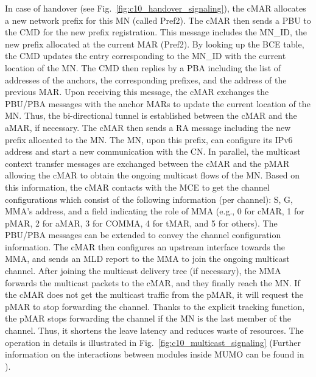 In case of handover (see Fig.~\ref{fig:c10_handover_signaling}), the cMAR allocates a new network prefix for this MN (called Pref2). The cMAR then sends a PBU to the CMD for the new prefix registration. This message includes the MN\_ID, the new prefix allocated at the current MAR (Pref2). By looking up the BCE table, the CMD updates the entry corresponding to the MN\_ID with the current location of the MN. The CMD then replies by a PBA including the list of addresses of the anchors, the corresponding prefixes, and the address of the previous MAR. Upon receiving this message, the cMAR exchanges the PBU/PBA messages with the anchor MARs to update the current location of the MN. Thus, the bi-directional tunnel is established between the cMAR and the aMAR, if necessary. The cMAR then sends a RA message including the new prefix allocated to the MN. The MN, upon this prefix, can configure its IPv6 address and start a new communication with the CN. In parallel, the multicast context transfer messages are exchanged between the cMAR and the pMAR allowing the cMAR to obtain the ongoing multicast flows of the MN. Based on this information, the cMAR contacts with the MCE to get the channel configurations which consist of the following information (per channel): S, G, MMA's address, and a field indicating the role of MMA (e.g., 0 for cMAR, 1 for pMAR, 2 for aMAR, 3 for COMMA, 4 for tMAR, and 5 for others). The PBU/PBA messages can be extended to convey the channel configuration information. The cMAR then configures an upstream interface towards the MMA, and sends an MLD report to the MMA to join the ongoing multicast channel. After joining the multicast delivery tree (if necessary), the MMA forwards the multicast packets to the cMAR, and they finally reach the MN. If the cMAR does not get the multicast traffic from the pMAR, it will request the pMAR to stop forwarding the channel. Thanks to the explicit tracking function, the pMAR stops forwarding the channel if the MN is the last member of the channel. Thus, it shortens the leave latency and reduces waste of resources. The operation in details is illustrated in Fig.~\ref{fig:c10_multicast_signaling} (Further information on the interactions between modules inside MUMO can be found in \cite{Thinh_VTC, d4.4}). 

